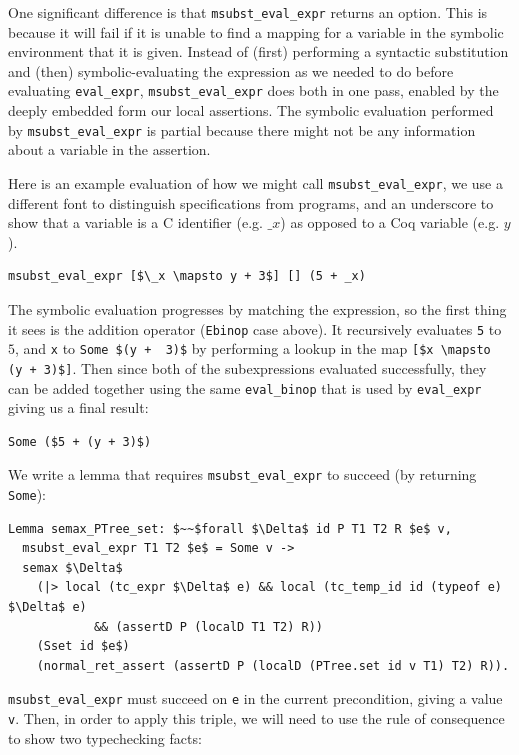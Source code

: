 \documentclass{puthesis}
\begin{document}
One significant difference is that \lstinline|msubst_eval_expr| returns
an option. This is because it will fail if it is unable to find a
mapping for a variable in the symbolic environment that it is
given. Instead of (first) performing a
syntactic substitution and (then) symbolic-evaluating the expression
as we needed to do before evaluating \lstinline|eval_expr|,
\lstinline|msubst_eval_expr| does both in one pass, enabled by the
deeply embedded form our local assertions.  The symbolic evaluation
performed by \lstinline|msubst_eval_expr| is partial because there
might not be any information about a variable in the assertion.

Here is an example evaluation of how we might call
\lstinline|msubst_eval_expr|, we use a different font to distinguish
specifications from programs, and an underscore to show that a
variable is a C identifier (e.g. $\_x$) as opposed to a Coq
variable (e.g. $y$).

\begin{lstlisting}
msubst_eval_expr [$\_x \mapsto y + 3$] [] (5 + _x)
\end{lstlisting}

The symbolic evaluation progresses by matching the expression, so the first thing it sees
is the addition operator (\lstinline|Ebinop| case above). It
recursively evaluates \lstinline|5| to $5$,
and \lstinline|x| to \lstinline|Some $(y +  3)$| by performing a lookup in the map
\lstinline|[$x \mapsto (y + 3)$]|. Then since both of the subexpressions
evaluated successfully, they can be added together using the same
\lstinline|eval_binop| that is used by \lstinline|eval_expr| giving us
a final result:

\begin{lstlisting}
Some ($5 + (y + 3)$)
\end{lstlisting}

We write a lemma that requires \lstinline|msubst_eval_expr| to succeed
(by returning \lstinline|Some|):

\begin{lstlisting}
Lemma semax_PTree_set: $~~$forall $\Delta$ id P T1 T2 R $e$ v,
  msubst_eval_expr T1 T2 $e$ = Some v ->
  semax $\Delta$
    (|> local (tc_expr $\Delta$ e) && local (tc_temp_id id (typeof e) $\Delta$ e) 
            && (assertD P (localD T1 T2) R))
    (Sset id $e$)
    (normal_ret_assert (assertD P (localD (PTree.set id v T1) T2) R)).
\end{lstlisting}

\lstinline|msubst_eval_expr| must succeed on \lstinline|e| in the
current precondition, giving a value \lstinline|v|. Then, in order to
apply this triple, we will need to use the rule of consequence to show
two typechecking facts:
\end{document}
